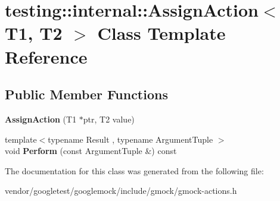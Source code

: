 \hypertarget{classtesting_1_1internal_1_1_assign_action}{}\section{testing\+:\+:internal\+:\+:Assign\+Action$<$ T1, T2 $>$ Class Template Reference}
\label{classtesting_1_1internal_1_1_assign_action}
\subsection*{Public Member Functions}
\begin{DoxyCompactItemize}
\item 
\mbox{\label{classtesting_1_1internal_1_1_assign_action_ae5a8fe8954ff3f8b26a08b57c3afdf9a}} 
{\bfseries Assign\+Action} (T1 $\ast$ptr, T2 value)
\item 
\mbox{\label{classtesting_1_1internal_1_1_assign_action_a540912bec1f4de6fc4c7de26312e4586}} 
{\footnotesize template$<$typename Result , typename Argument\+Tuple $>$ }\\void {\bfseries Perform} (const Argument\+Tuple \&) const
\end{DoxyCompactItemize}


The documentation for this class was generated from the following file\+:\begin{DoxyCompactItemize}
\item 
vendor/googletest/googlemock/include/gmock/gmock-\/actions.\+h\end{DoxyCompactItemize}
